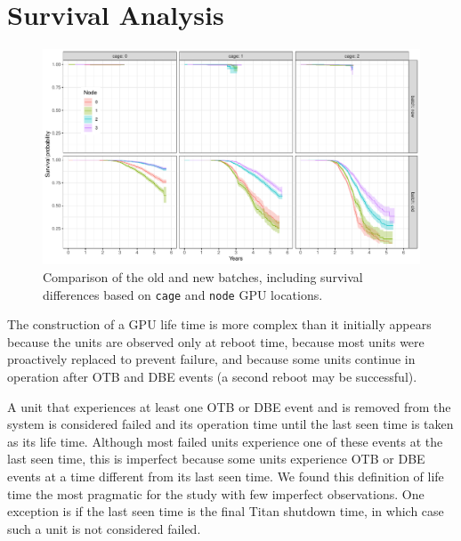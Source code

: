 \section{Survival Analysis}
\label{section:survival}
\renewcommand{\pkg}[1]{\textsf{#1}}
\begin{figure}
  \centering
  \includegraphics[width=7in]{figs/km_cage-node_a001.pdf}
  \caption{Comparison of the old and new batches, including survival
    differences based on {\tt cage} and {\tt node} GPU locations.}
  \label{fig:km-all-cage-node}
\end{figure}
The construction of a GPU life time is more complex than it initially
appears because the units are observed only at reboot time, because
most units were proactively replaced to prevent failure, and because
some units continue in operation after OTB and DBE events (a second
reboot may be successful).

A unit that experiences at least one OTB or DBE event and is removed
from the system is considered failed and its operation time until the
last seen time is taken as its life time. Although most failed units
experience one of these events at the last seen time, this is
imperfect because some units experience OTB or DBE events at a time
different from its last seen time. We found this definition of life
time the most pragmatic for the study with few imperfect
observations. One exception is if the last seen time is the final
Titan shutdown time, in which case such a unit is not considered
failed.


